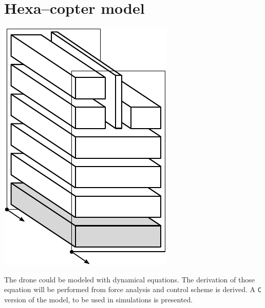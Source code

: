 \section{Hexa--copter model}
\begin{marginfigure}
	\centering
	\includegraphics[scale=0.5]{ch3/img/PA_map_dynamic.pdf}
\end{marginfigure}
The drone could be modeled with dynamical equations. The derivation of those equation will be performed from force analysis and control scheme is derived. A \texttt{C} version of the model, to be used in simulations is presented.

